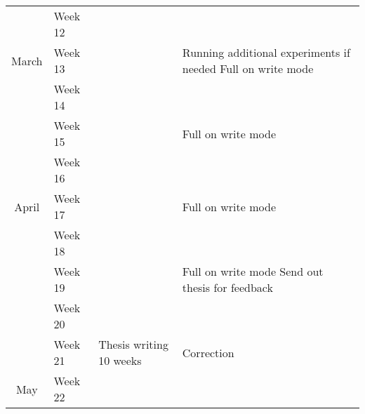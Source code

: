 \documentclass[a4paper,10pt,titlepage]{report}
\begin{document}
\begin{tabular}{clll}
                                & Week 12      &                                             &                                                                                                                            \\
\multirow{-5}{*}{March}         & Week 13      &                                             & \multirow{-2}{*}{Running additional experiments if needed  Full on write mode} \\
                                & Week 14      &                                             &                                                                                                                            \\
                                & Week 15      &                                             & \multirow{-2}{*}{Full on write mode}                                                                                       \\
                                & Week 16      &                                             &                                                                                                                            \\
\multirow{-4}{*}{April}         & Week 17      &                                             & \multirow{-2}{*}{Full on write mode}                                                                                       \\
                                & Week 18      &                                             &                                                                                                                            \\
                                & Week 19      &                                             & \multirow{-2}{*}{Full on write mode    Send out thesis for feedback}             \\
                                & Week 20      &                                             &                                                                                                                            \\
                                & Week 21      & \multirow{-10}{*}{Thesis writing  10 weeks} & \multirow{-2}{*}{Correction}                                                                                               \\
\multirow{-5}{*}{May}           & Week 22      &                                             &                                                                                                                            \\

\end{tabular}
\end{document}
